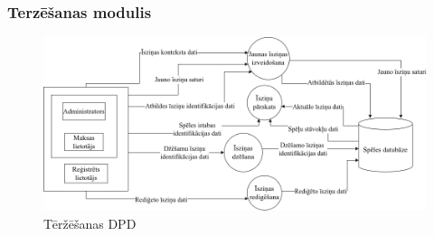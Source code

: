 \subsubsection{Terzēšanas modulis}

\begin{figure}[htbp]
	\centering
	\includegraphics[width=\linewidth]{./src/img/TerzēšanasModulis.png}
	\caption{Tēržēšanas DPD}
	\label{fig:dpd-2-chat}
\end{figure}





